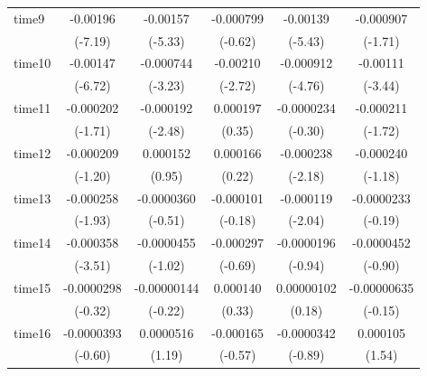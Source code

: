 \begin{table}[htbp]
\begin{tabular}{l*{5}{c}}
time9       &    -0.00196\sym{***}&    -0.00157\sym{***}&   -0.000799         &    -0.00139\sym{***}&   -0.000907         \\
            &     (-7.19)         &     (-5.33)         &     (-0.62)         &     (-5.43)         &     (-1.71)         \\
time10      &    -0.00147\sym{***}&   -0.000744\sym{**} &    -0.00210\sym{**} &   -0.000912\sym{***}&    -0.00111\sym{***}\\
            &     (-6.72)         &     (-3.23)         &     (-2.72)         &     (-4.76)         &     (-3.44)         \\
time11      &   -0.000202         &   -0.000192\sym{*}  &    0.000197         &  -0.0000234         &   -0.000211         \\
            &     (-1.71)         &     (-2.48)         &      (0.35)         &     (-0.30)         &     (-1.72)         \\
time12      &   -0.000209         &    0.000152         &    0.000166         &   -0.000238\sym{*}  &   -0.000240         \\
            &     (-1.20)         &      (0.95)         &      (0.22)         &     (-2.18)         &     (-1.18)         \\
time13      &   -0.000258         &  -0.0000360         &   -0.000101         &   -0.000119\sym{*}  &  -0.0000233         \\
            &     (-1.93)         &     (-0.51)         &     (-0.18)         &     (-2.04)         &     (-0.19)         \\
time14      &   -0.000358\sym{***}&  -0.0000455         &   -0.000297         &  -0.0000196         &  -0.0000452         \\
            &     (-3.51)         &     (-1.02)         &     (-0.69)         &     (-0.94)         &     (-0.90)         \\
time15      &  -0.0000298         & -0.00000144         &    0.000140         &  0.00000102         & -0.00000635         \\
            &     (-0.32)         &     (-0.22)         &      (0.33)         &      (0.18)         &     (-0.15)         \\
time16      &  -0.0000393         &   0.0000516         &   -0.000165         &  -0.0000342         &    0.000105         \\
            &     (-0.60)         &      (1.19)         &     (-0.57)         &     (-0.89)         &      (1.54)         \\

\end{tabular}
\end{table}
